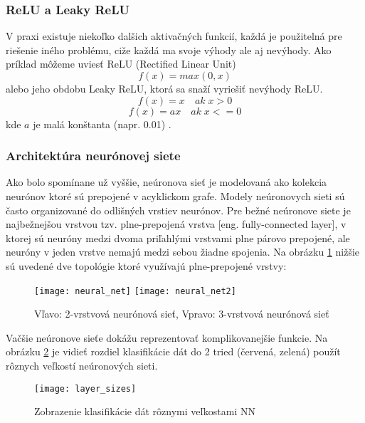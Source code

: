 \subsubsection{ReLU a Leaky ReLU}
V praxi existuje niekoľko dalšich aktivačných funkcií, každá je použitelná pre riešenie iného problému,
    ciže každá ma svoje výhody ale aj nevýhody.
Ako príklad môžeme uviesť ReLU (Rectified Linear Unit)
\begin{equation}
    f(x) = max(0,x)
\end{equation}
alebo jeho obdobu Leaky ReLU, ktorá sa snaží vyriešiť nevýhody ReLU.
\begin{equation}
    f(x) = x \quad ak \; x > 0
\end{equation}
\begin{equation}
    f(x) = ax \quad ak \; x <= 0
\end{equation}
kde $a$ je malá konštanta (napr. 0.01) \cite{odkaz:ConvolutionalNeuralNetworkCS231n}.

\subsubsection{Architektúra neurónovej siete}
Ako bolo spomínane už vyššie, neúronova sieť je modelovaná ako kolekcia neurónov ktoré sú prepojené v acyklickom grafe.
Modely neúronovych sieti sú často organizované do odlišných vrstiev neurónov.
Pre bežné neúronove siete je najbežnejšou vrstvou tzv. plne-prepojená vrstva [eng. fully-connected layer],
    v ktorej sú neuróny medzi dvoma priľahlými vrstvami plne párovo prepojené, ale neuróny v jeden vrstve nemajú medzi sebou žiadne spojenia.
Na obrázku \ref{pic:NeuralNetworkArchitecture} nižšie sú uvedené dve topológie ktoré využívajú plne-prepojené vrstvy\cite{odkaz:ConvolutionalNeuralNetworkCS231n}:
\begin{figure}[H]
    \centering
    \texttt{[image: neural\_net]}
    \qquad
    \texttt{[image: neural\_net2]}
    \caption{Vľavo: 2-vrstvová neurónová sieť, Vpravo: 3-vrstvová neurónová sieť \cite{odkaz:ConvolutionalNeuralNetworkCS231n}}
    \label{pic:NeuralNetworkArchitecture}
\end{figure}

Vačšie neúronove sieťe dokážu reprezentovať komplikovanejšie funkcie.
Na obrázku \ref{pic:XNNLayerExample} je vidieť rozdiel klasifikácie dát do 2 tried (červená, zelená) použít rôznych veľkostí neúronových sieti.
\begin{figure}[H]
	\centering
	\texttt{[image: layer\_sizes]}
	\caption{Zobrazenie klasifikácie dát rôznymi veľkostami NN \cite{odkaz:ConvolutionalNeuralNetworkCS231n}}
	\label{pic:XNNLayerExample}
\end{figure}

